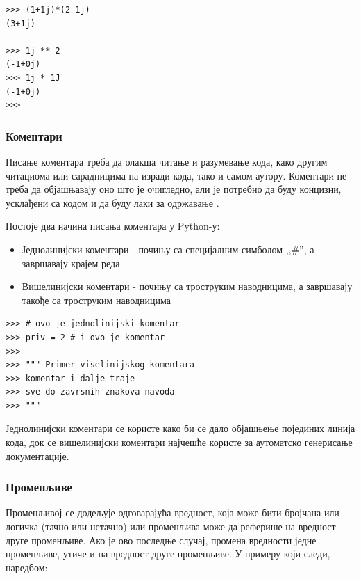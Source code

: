 \begin{lstlisting}[caption = Операције са комплексним бројевима, label = kompleksni]
>>> (1+1j)*(2-1j)
(3+1j)

>>> 1j ** 2
(-1+0j)
>>> 1j * 1J
(-1+0j)
>>>
\end{lstlisting}

\subsubsection{Коментари}

Писање коментара треба да олакша читање и разумевање кода, како другим читациома или сарадницима на изради кода, тако и самом аутору. Коментари не треба да објашњавају оно што је очигледно, али је потребно да буду концизни, усклађени са кодом и да буду лаки за одржавање \cite{maric}.

Постоје два начина писања коментара у Python-у:

\begin{itemize}
\item Једнолинијски коментари - почињу са специјалним симболом ,,\#'', а завршавају крајем реда
\item Вишелинијски коментари - почињу са троструким наводницима, а завршавају такође са троструким наводницима
\end{itemize}

\begin{lstlisting}[caption = Писање коментара, label = komentari]
>>> # ovo je jednolinijski komentar
>>> priv = 2 # i ovo je komentar
>>>
>>> """ Primer viselinijskog komentara
>>> komentar i dalje traje
>>> sve do zavrsnih znakova navoda
>>> """
\end{lstlisting}

Једнолинијски коментари се користе како би се дало објашњење појединих линија кода, док се вишелинијски коментари најчешће користе за аутоматско генерисање документације.

\pagebreak

\subsubsection{Променљиве}

Променљивој се додељује одговарајућа вредност, која може бити бројчана или логичка (тачно или нетачно) или променљива може да реферише на вредност друге променљиве. Ако је ово последње случај, промена вредности једне променљиве, утиче и на вредност друге променљиве. У примеру који следи, наредбом:

